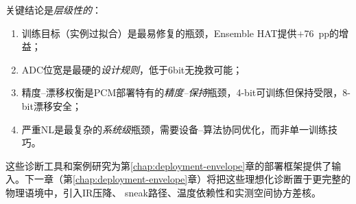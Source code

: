 关键结论是\emph{层级性的}：
\begin{enumerate}
    \item 训练目标（实例过拟合）是最易修复的瓶颈，Ensemble HAT提供$+$76~pp的增益；
    \item ADC位宽是最硬的\emph{设计规则}，低于6bit无挽救可能；
    \item 精度--漂移权衡是PCM部署特有的\emph{精度--保持}瓶颈，4-bit可训练但保持受限，8-bit漂移安全；
    \item 严重NL是最复杂的\emph{系统级}瓶颈，需要设备--算法协同优化，而非单一训练技巧。
\end{enumerate}

这些诊断工具和案例研究为第\ref{chap:deployment-envelope}章的部署框架提供了输入。下一章（第\ref{chap:deployment-envelope}章）将把这些理想化诊断置于更完整的物理语境中，引入IR压降、 sneak路径、温度依赖性和实测空间协方差核。
